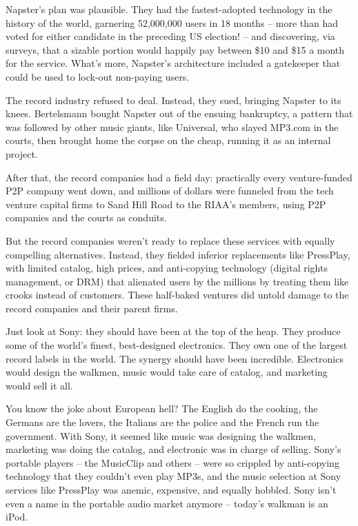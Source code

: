 Napster's plan was plausible. They had the fastest-adopted
technology in the history of the world, garnering 52,000,000 users
in 18 months -- more than had voted for either candidate in the
preceding US election! -- and discovering, via surveys, that a
sizable portion would happily pay between \$10 and \$15 a month for
the service. What's more, Napster's architecture included a
gatekeeper that could be used to lock-out non-paying users.

The record industry refused to deal. Instead, they sued, bringing
Napster to its knees. Bertelsmann bought Napster out of the ensuing
bankruptcy, a pattern that was followed by other music giants, like
Universal, who slayed MP3.com in the courts, then brought home the
corpse on the cheap, running it as an internal project.

After that, the record companies had a field day: practically every
venture-funded P2P company went down, and millions of dollars were
funneled from the tech venture capital firms to Sand Hill Road to
the RIAA's members, using P2P companies and the courts as
conduits.

But the record companies weren't ready to replace these services
with equally compelling alternatives. Instead, they fielded
inferior replacements like PressPlay, with limited catalog, high
prices, and anti-copying technology (digital rights management, or
DRM) that alienated users by the millions by treating them like
crooks instead of customers. These half-baked ventures did untold
damage to the record companies and their parent firms.

Just look at Sony: they should have been at the top of the heap.
They produce some of the world's finest, best-designed electronics.
They own one of the largest record labels in the world. The synergy
should have been incredible. Electronics would design the walkmen,
music would take care of catalog, and marketing would sell it all.

You know the joke about European hell? The English do the cooking,
the Germans are the lovers, the Italians are the police and the
French run the government. With Sony, it seemed like music was
designing the walkmen, marketing was doing the catalog, and
electronic was in charge of selling. Sony's portable players -- the
MusicClip and others -- were so crippled by anti-copying technology
that they couldn't even play MP3s, and the music selection at Sony
services like PressPlay was anemic, expensive, and equally hobbled.
Sony isn't even a name in the portable audio market anymore --
today's walkman is an iPod.

